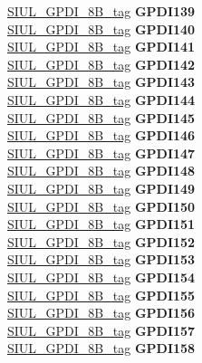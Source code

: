 \begin{DoxyCompactItemize}
\begin{tabbing}
\>\>\mbox{\hyperlink{unionSIUL__GPDI__8B__tag}{SIUL\_GPDI\_8B\_tag}} {\bfseries GPDI139}\\
\>\>\mbox{\hyperlink{unionSIUL__GPDI__8B__tag}{SIUL\_GPDI\_8B\_tag}} {\bfseries GPDI140}\\
\>\>\mbox{\hyperlink{unionSIUL__GPDI__8B__tag}{SIUL\_GPDI\_8B\_tag}} {\bfseries GPDI141}\\
\>\>\mbox{\hyperlink{unionSIUL__GPDI__8B__tag}{SIUL\_GPDI\_8B\_tag}} {\bfseries GPDI142}\\
\>\>\mbox{\hyperlink{unionSIUL__GPDI__8B__tag}{SIUL\_GPDI\_8B\_tag}} {\bfseries GPDI143}\\
\>\>\mbox{\hyperlink{unionSIUL__GPDI__8B__tag}{SIUL\_GPDI\_8B\_tag}} {\bfseries GPDI144}\\
\>\>\mbox{\hyperlink{unionSIUL__GPDI__8B__tag}{SIUL\_GPDI\_8B\_tag}} {\bfseries GPDI145}\\
\>\>\mbox{\hyperlink{unionSIUL__GPDI__8B__tag}{SIUL\_GPDI\_8B\_tag}} {\bfseries GPDI146}\\
\>\>\mbox{\hyperlink{unionSIUL__GPDI__8B__tag}{SIUL\_GPDI\_8B\_tag}} {\bfseries GPDI147}\\
\>\>\mbox{\hyperlink{unionSIUL__GPDI__8B__tag}{SIUL\_GPDI\_8B\_tag}} {\bfseries GPDI148}\\
\>\>\mbox{\hyperlink{unionSIUL__GPDI__8B__tag}{SIUL\_GPDI\_8B\_tag}} {\bfseries GPDI149}\\
\>\>\mbox{\hyperlink{unionSIUL__GPDI__8B__tag}{SIUL\_GPDI\_8B\_tag}} {\bfseries GPDI150}\\
\>\>\mbox{\hyperlink{unionSIUL__GPDI__8B__tag}{SIUL\_GPDI\_8B\_tag}} {\bfseries GPDI151}\\
\>\>\mbox{\hyperlink{unionSIUL__GPDI__8B__tag}{SIUL\_GPDI\_8B\_tag}} {\bfseries GPDI152}\\
\>\>\mbox{\hyperlink{unionSIUL__GPDI__8B__tag}{SIUL\_GPDI\_8B\_tag}} {\bfseries GPDI153}\\
\>\>\mbox{\hyperlink{unionSIUL__GPDI__8B__tag}{SIUL\_GPDI\_8B\_tag}} {\bfseries GPDI154}\\
\>\>\mbox{\hyperlink{unionSIUL__GPDI__8B__tag}{SIUL\_GPDI\_8B\_tag}} {\bfseries GPDI155}\\
\>\>\mbox{\hyperlink{unionSIUL__GPDI__8B__tag}{SIUL\_GPDI\_8B\_tag}} {\bfseries GPDI156}\\
\>\>\mbox{\hyperlink{unionSIUL__GPDI__8B__tag}{SIUL\_GPDI\_8B\_tag}} {\bfseries GPDI157}\\
\>\>\mbox{\hyperlink{unionSIUL__GPDI__8B__tag}{SIUL\_GPDI\_8B\_tag}} {\bfseries GPDI158}\\

\end{tabbing}
\end{DoxyCompactItemize}
